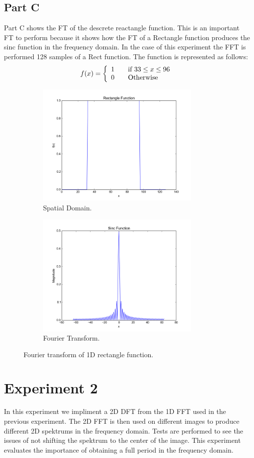 \documentclass[letter]{article}
\begin{document}
\subsection{Part C}
Part C shows the FT of the descrete reactangle function. This is an important FT to perform because it shows how the FT of a Rectangle function produces the sinc function in the frequency domain. In the case of this experiment the FFT is performed 128 samples of a Rect function. The function is represented as follows: $$f(x) = \left \{ \begin{array}{l l} 1 & \quad \text{if $33 \leq x \leq 96$}\\ 0 & \quad \text{Otherwise}\end{array} \right.$$
\begin{figure}[hbtp]
  \centering
  \begin{subfigure}{8cm}
    \includegraphics[width=8cm]{images/function_rect.png}
    \caption{Spatial Domain.}
  \end{subfigure}
  \begin{subfigure}{8cm}
    \includegraphics[width=8cm]{images/sincl_plot.png}
    \caption{Fourier Transform.}
  \end{subfigure}
  \caption{Fourier transform of 1D rectangle function.}
  \label{fig:ft_cos}
\end{figure}
\section{Experiment 2}
In this experiment we impliment a 2D DFT from the 1D FFT used in the previous experiment. The 2D FFT is then used on different images to produce different 2D spektrums in the frequency domain. Tests are performed to see the issues of not shifting the spektrum to the center of the image. This experiment evaluates the importance of obtaining a full period in the frequency domain.
\end{document}
